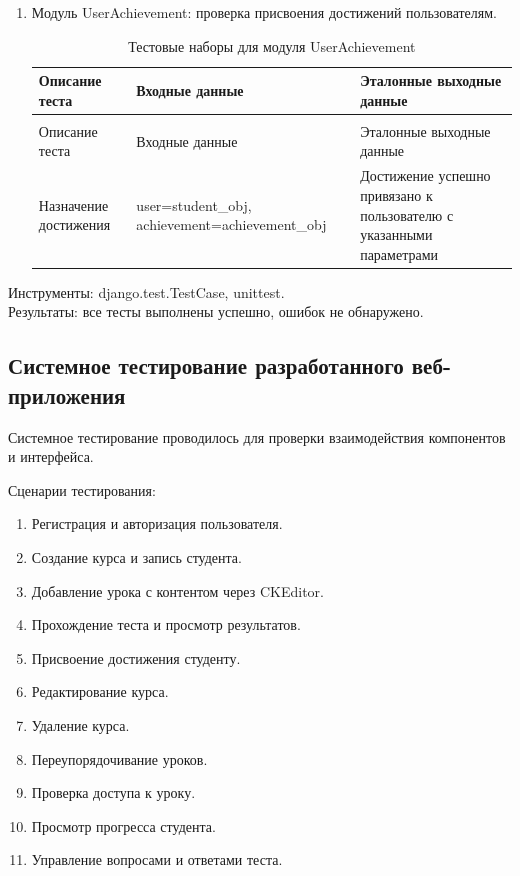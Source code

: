 \begin{enumerate}
	\item Модуль UserAchievement: проверка присвоения достижений пользователям.
	\begin{xltabular}{\textwidth}{|p{3cm}|p{6cm}|p{6cm}|}
		\caption{Тестовые наборы для модуля UserAchievement\label{tab:userachievement_tests}}\\
		\hline
		Описание теста & Входные данные & Эталонные выходные данные \\ \hline
		\endfirsthead
		\\
		\hline
		Описание теста & Входные данные & Эталонные выходные данные \\ \hline
		\endhead
		Назначение достижения & user=student\_obj, achievement=achievement\_obj & Достижение успешно привязано к пользователю с указанными параметрами \\ \hline
	\end{xltabular}
\end{enumerate}


Инструменты: django.test.TestCase, unittest.\\
Результаты: все тесты выполнены успешно, ошибок не обнаружено.


\subsection{Системное тестирование разработанного веб-приложения}

Системное тестирование проводилось для проверки взаимодействия компонентов и интерфейса.

Сценарии тестирования:
	\begin{enumerate}
	\item Регистрация и авторизация пользователя.
	\item Создание курса и запись студента.
	\item Добавление урока с контентом через CKEditor.
	\item Прохождение теста и просмотр результатов.
	\item Присвоение достижения студенту.
	\item Редактирование курса.
	\item Удаление курса.
	\item Переупорядочивание уроков.
	\item Проверка доступа к уроку.
	\item Просмотр прогресса студента.
	\item Управление вопросами и ответами теста.
	\end{enumerate}


